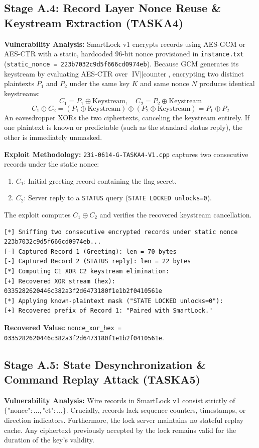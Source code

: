 \documentclass[11pt,a4paper]{article}
\begin{document}
\subsection{Stage A.4: Record Layer Nonce Reuse \& Keystream Extraction (TASKA4)}
\textbf{Vulnerability Analysis:}  
SmartLock v1 encrypts records using AES-GCM or AES-CTR with a static, hardcoded 96-bit nonce provisioned in \texttt{instance.txt} (\texttt{static\_nonce = 223b7032c9d5f666cd0974eb}). Because GCM generates its keystream by evaluating AES-CTR over $\text{IV} \parallel \text{counter}$, encrypting two distinct plaintexts $P_1$ and $P_2$ under the same key $K$ and same nonce $N$ produces identical keystreams:
\[
C_1 = P_1 \oplus \text{Keystream}, \quad C_2 = P_2 \oplus \text{Keystream}
\]
\[
C_1 \oplus C_2 = (P_1 \oplus \text{Keystream}) \oplus (P_2 \oplus \text{Keystream}) = P_1 \oplus P_2
\]
An eavesdropper XORs the two ciphertexts, canceling the keystream entirely. If one plaintext is known or predictable (such as the standard status reply), the other is immediately unmasked.

\textbf{Exploit Methodology:}  
\texttt{23i-0614-G-TASKA4-V1.cpp} captures two consecutive records under the static nonce:
\begin{enumerate}
    \item $C_1$: Initial greeting record containing the flag secret.
    \item $C_2$: Server reply to a \texttt{STATUS} query (\texttt{STATE LOCKED unlocks=0}).
\end{enumerate}
The exploit computes $C_1 \oplus C_2$ and verifies the recovered keystream cancellation.

\begin{lstlisting}[caption={Stage A.4 Terminal Output (\texttt{23i-0614-G-TASKA4-V1})}]
[*] Sniffing two consecutive encrypted records under static nonce 223b7032c9d5f666cd0974eb...
[-] Captured Record 1 (Greeting): len = 70 bytes
[-] Captured Record 2 (STATUS reply): len = 22 bytes
[*] Computing C1 XOR C2 keystream elimination:
[+] Recovered XOR stream (hex): 0335282620446c382a3f2d6473180f1e1b2f0410561e
[*] Applying known-plaintext mask ("STATE LOCKED unlocks=0"):
[+] Recovered prefix of Record 1: "Paired with SmartLock."
\end{lstlisting}
\textbf{Recovered Value:} \texttt{nonce\_xor\_hex = 0335282620446c382a3f2d6473180f1e1b2f0410561e}.

\subsection{Stage A.5: State Desynchronization \& Command Replay Attack (TASKA5)}
\textbf{Vulnerability Analysis:}  
Wire records in SmartLock v1 consist strictly of $\{\text{"nonce"}: \dots, \text{"ct"}: \dots\}$. Crucially, records lack sequence counters, timestamps, or direction indicators. Furthermore, the lock server maintains no stateful replay cache. Any ciphertext previously accepted by the lock remains valid for the duration of the key's validity.
\end{document}
